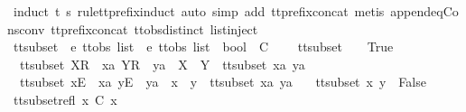 \isamarkupfalse%
\ {\isacharparenleft}induct\ t{}\ s{}\ rule{\isacharcolon}tt{\isacharunderscore}prefix{\isachardot}induct{\isacharcomma}\ auto\ simp\ add{\isacharcolon}\ tt{\isacharunderscore}prefix{\isacharunderscore}concat{\isacharcomma}\ metis\ append{\isacharunderscore}eq{\isacharunderscore}Cons{\isacharunderscore}conv\ tt{\isacharunderscore}prefix{\isacharunderscore}concat\ ttobs{\isachardot}distinct{\isacharparenleft}{}{\isacharparenright}\ list{\isachardot}inject{\isacharparenright}%
\endisatagproof
{\isafoldproof}%
%
\isadelimproof
%
\endisadelimproof
%
\isadelimdocument
%
\endisadelimdocument
%
\isatagdocument
%
\isamarkuptrue%
%
\endisatagdocument
{\isafolddocument}%
%
\isadelimdocument
%
\endisadelimdocument
{}\isamarkupfalse%
\ tt{\isacharunderscore}subset\ {\isacharcolon}{\isacharcolon}\ {\isachardoublequoteopen}{\isacharprime}e\ ttobs\ list\ {\isasymRightarrow}\ {\isacharprime}e\ ttobs\ list\ {\isasymRightarrow}\ bool{\isachardoublequoteclose}\ {\isacharparenleft}\ {\isachardoublequoteopen}{\isasymsubseteq}\isactrlsub C{\isachardoublequoteclose}\ {}{}{\isacharparenright}\ \isanewline
\ \ {\isachardoublequoteopen}tt{\isacharunderscore}subset\ {\isacharbrackleft}{\isacharbrackright}\ {\isacharbrackleft}{\isacharbrackright}\ {\isacharequal}\ True{\isachardoublequoteclose}\ {\isacharbar}\isanewline
\ \ {\isachardoublequoteopen}tt{\isacharunderscore}subset\ {\isacharparenleft}{\isacharbrackleft}X{\isacharbrackright}\isactrlsub R\ {\isacharhash}\ xa{\isacharparenright}\ {\isacharparenleft}{\isacharbrackleft}Y{\isacharbrackright}\isactrlsub R\ {\isacharhash}\ ya{\isacharparenright}\ {\isacharequal}\ {\isacharparenleft}X\ {\isasymsubseteq}\ Y\ {\isasymand}\ tt{\isacharunderscore}subset\ xa\ ya{\isacharparenright}{\isachardoublequoteclose}\ {\isacharbar}\isanewline
\ \ {\isachardoublequoteopen}tt{\isacharunderscore}subset\ {\isacharparenleft}{\isacharbrackleft}x{\isacharbrackright}\isactrlsub E\ {\isacharhash}\ xa{\isacharparenright}\ {\isacharparenleft}{\isacharbrackleft}y{\isacharbrackright}\isactrlsub E\ {\isacharhash}\ ya{\isacharparenright}\ {\isacharequal}\ {\isacharparenleft}x\ {\isacharequal}\ y\ {\isasymand}\ tt{\isacharunderscore}subset\ xa\ ya{\isacharparenright}{\isachardoublequoteclose}\ {\isacharbar}\isanewline
\ \ {\isachardoublequoteopen}tt{\isacharunderscore}subset\ x\ y\ {\isacharequal}\ False{\isachardoublequoteclose}\isanewline
\isanewline
{}\isamarkupfalse%
\ tt{\isacharunderscore}subset{\isacharunderscore}refl{\isacharcolon}\ {\isachardoublequoteopen}x\ {\isasymsubseteq}\isactrlsub C\ x{\isachardoublequoteclose}\isanewline
